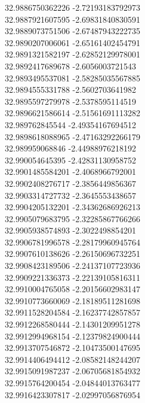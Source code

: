 {32.9886750362226	-2.72193183792973\\
32.9887921607595	-2.69831840830591\\
32.9889073751506	-2.67487943222735\\
32.9890207006061	-2.65161402454791\\
32.9891321582197	-2.62852129978001\\
32.9892417689678	-2.6056003721543\\
32.9893495537081	-2.58285035567885\\
32.9894555331788	-2.5602703641982\\
32.9895597279978	-2.5378595114519\\
32.9896621586614	-2.51561691113282\\
32.989762845544	-2.49354167694512\\
32.9898618088965	-2.47163292266179\\
32.989959068846	-2.44988976218192\\
32.990054645395	-2.42831130958752\\
32.9901485584201	-2.4068966792001\\
32.9902408276717	-2.3856449856367\\
32.9903314727732	-2.3645553438657\\
32.9904205132201	-2.34362686926213\\
32.9905079683795	-2.32285867766266\\
32.9905938574893	-2.3022498854201\\
32.9906781996578	-2.28179960945764\\
32.9907610138626	-2.26150696732251\\
32.9908423189506	-2.24137107723936\\
32.9909221336373	-2.22139105816311\\
32.9910004765058	-2.20156602983147\\
32.9910773660069	-2.18189511281698\\
32.9911528204584	-2.16237742857857\\
32.9912268580444	-2.14301209951278\\
32.9912994968154	-2.12379824900444\\
32.9913707546872	-2.10473500147695\\
32.9914406494412	-2.08582148244207\\
32.9915091987237	-2.06705681854932\\
32.9915764200454	-2.04844013763477\\
32.9916423307817	-2.02997056876954\\
}
